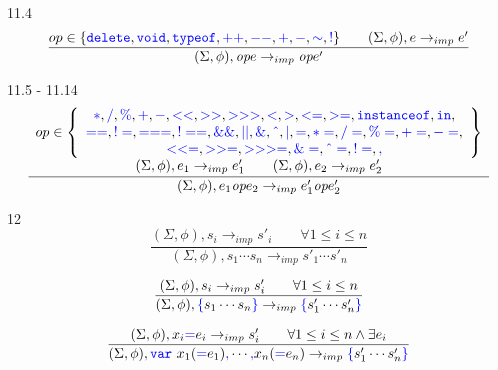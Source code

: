 \documentclass[a4paper]{article}
\newcommand{\caret}{\mathbin{\char`\^}}
\newcommand{\code}[1]{\textcolor{blue}{\tt #1}}
\begin{document}
11.4
\begin{equation*}
\frac{
    op \in \{ \code{delete}, \code{void}, \code{typeof}, \code{++}, \code{--}, \code{+}, \code{-}, \code{\sim}, \code{!} \} \qquad
    (\Sigma, \phi), e \rightarrow_{imp} e'
}{
    (\Sigma, \phi), \emph{op} e \rightarrow_{imp} \emph{op} e'
}
\end{equation*}

11.5 - 11.14
\begin{equation*}
\frac{
    \begin{array}{c}
    op \in \left\{\begin{array}{c}
    \code{*}, \code{/}, \code{\%}, \code{+}, \code{-}, \code{<<}, \code{>>}, \code{>>>}, \code{<}, \code{>}, \code{<=}, \code{>=}, \code{instanceof}, \code{in}, \\
    \code{==}, \code{!=}, \code{===}, \code{!==}, \code{\&\&}, \code{||}, \code{\&}, \code{\caret}, \code{|}, \code{=}, \code{*=}, \code{/=}, \code{\%=}, \code{+=}, \code{-=}, \\
    \code{<<=}, \code{>>=}, \code{>>>=}, \code{\&=}, \code{\caret =}, \code{!=}, \code{,}
    \end{array}\right\} \\
    (\Sigma, \phi), e_1 \rightarrow_{imp} e'_1 \qquad
    (\Sigma, \phi), e_2 \rightarrow_{imp} e'_2 \\
    \end{array}
}{
    (\Sigma, \phi), e_1 \emph{op} e_2 \rightarrow_{imp} e'_1 \emph{op} e'_2
}
\end{equation*}

12
\begin{equation*}
\frac{
    (\Sigma, \phi), s_i \rightarrow_{imp} s'_i \qquad \forall 1 \le i \le n
}{
    (\Sigma, \phi), s_1 \cdots s_n \rightarrow_{imp} s'_1 \cdots s'_n
}
\end{equation*}

\begin{equation*}
\frac{
    (\Sigma, \phi), s_i \rightarrow_{imp} s'_i \qquad \forall 1 \le i \le n
}{
    (\Sigma, \phi), \code{\{} s_1 \cdots s_n \code{\}} \rightarrow_{imp} \code{\{} s'_1 \cdots s'_n \code{\}}
}
\end{equation*}

\begin{equation*}
\frac{
    (\Sigma, \phi), x_i \code{=} e_i \rightarrow_{imp} s'_i \qquad \forall 1 \le i \le n \wedge \exists e_i
}{
    (\Sigma, \phi), \code{var}\ x_1 (\code{=} e_1) \code{,} \cdots \code{,} x_n (\code{=} e_n) \rightarrow_{imp} \code{\{} s'_1 \cdots s'_n \code{\}}
}
\end{equation*}
\end{document}
